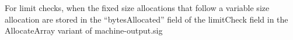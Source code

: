 For limit checks, when the fixed size allocations that follow a variable size
allocation are stored in the ``bytesAllocated'' field of the limitCheck field in
the AllocateArray variant of machine-output.sig
